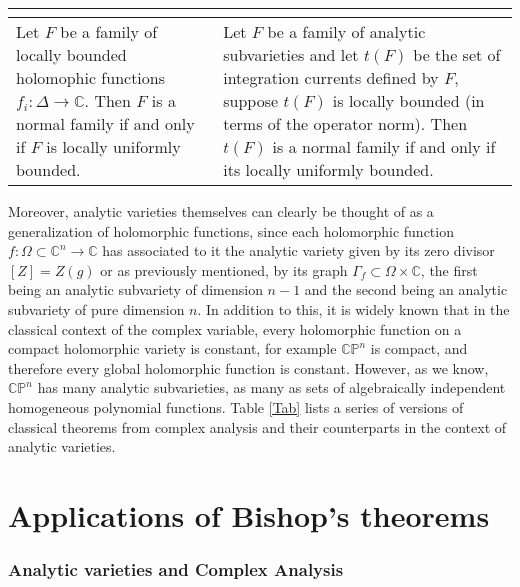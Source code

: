 \documentclass[12pt,twoside,a4paper]{report}
\newcommand{\co}{\ensuremath{\mathbb C }}
\newcommand{\con}{\ensuremath{\mathbb{C}^n}}
\newcommand{\cp}{\ensuremath{\mathbb{CP}}}
\begin{document}
\begin{table}[h!]
\begin{tabular}{| m{5cm} | m{5cm} |}
\begin{center}
                            \end{center}\\
                            \midrule
                                    Let $F$ be a family of locally bounded
                                    holomophic functions $f_i:\Delta\rightarrow\co$.
                                    Then $F$ is a normal family if and only if $F$ is locally uniformly bounded.
                                         &
                                    Let $F$ be a family of analytic subvarieties and let $t(F)$
                                    be the set of integration currents defined by $F$, suppose $t(F)$
                                    is locally bounded (in terms of the operator norm).
                                    Then $t(F)$ is a normal family if and only if its locally uniformly bounded.\\
                            \bottomrule
            \end{tabular}
\end{table}

Moreover, analytic varieties themselves can clearly be thought of as a generalization of holomorphic functions, since each holomorphic function $f:\Omega\subset\con\rightarrow\co$ has associated to it the analytic variety given by its zero divisor $[Z]=Z(g)$ or as previously mentioned, by its graph $\Gamma_{f}\subset\Omega\times\co$, the first being an analytic subvariety of dimension $n-1$ and the second being an analytic subvariety of pure dimension $n$. In addition to this, it is widely known that in the classical context of the complex variable, every holomorphic function on a compact holomorphic variety is constant, for example $\cp^n$ is compact, and therefore every global holomorphic function is constant. However, as we know, $\cp^n$ has many analytic subvarieties, as many as sets of algebraically independent homogeneous polynomial functions. Table \ref{Tab} lists a series of versions of classical theorems from complex analysis and their counterparts in the context of analytic varieties.

\chapter{Applications of Bishop's theorems}
\subsection{Analytic varieties and Complex Analysis}
\end{document}
